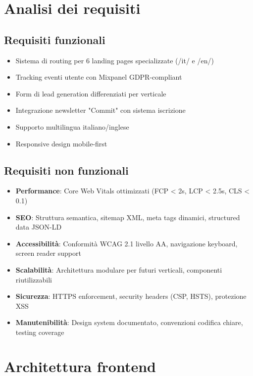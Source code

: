 \section{Analisi dei requisiti}
\subsection{Requisiti funzionali}
\begin{itemize}
  \item Sistema di routing per 6 landing pages specializzate 
        (/it/ e /en/)
  \item Tracking eventi utente con Mixpanel GDPR-compliant
  \item Form di lead generation differenziati per verticale
  \item Integrazione newsletter "Commit" con sistema iscrizione
  \item Supporto multilingua italiano/inglese
  \item Responsive design mobile-first
\end{itemize}

\subsection{Requisiti non funzionali}
\begin{itemize}
  \item \textbf{Performance}: Core Web Vitals ottimizzati 
        (FCP < 2s, LCP < 2.5s, CLS < 0.1)
  \item \textbf{SEO}: Struttura semantica, sitemap XML, meta tags 
        dinamici, structured data JSON-LD
  \item \textbf{Accessibilità}: Conformità WCAG 2.1 livello AA, 
        navigazione keyboard, screen reader support
  \item \textbf{Scalabilità}: Architettura modulare per futuri 
        verticali, componenti riutilizzabili
  \item \textbf{Sicurezza}: HTTPS enforcement, security headers 
        (CSP, HSTS), protezione XSS
  \item \textbf{Manutenibilità}: Design system documentato, 
        convenzioni codifica chiare, testing coverage
\end{itemize}

\section{Architettura frontend}
